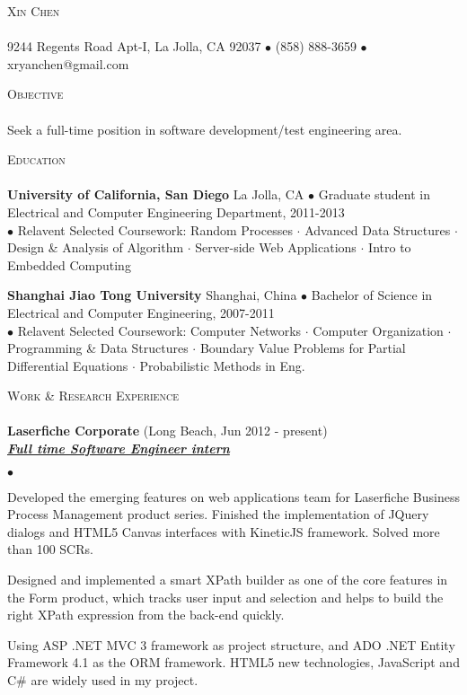 \documentclass{article}
\newcommand{\lineunder}{\vspace*{-8pt} \\ \hspace*{-18pt} \hrulefill \\}
\newcommand{\header}[1]{{\hspace*{-15pt}\vspace*{6pt} \textsc{#1}} \vspace*{-6pt} \lineunder}
\newcommand{\employer}[3]{{ \textbf{#1} (#2)\\ \underline{\textbf{\emph{#3}}}\\  }}
\newcommand{\contact}[2]{
\vspace*{-8pt}
\begin{center}
{\LARGE \scshape {#1}}
\lineunder 
#2
\end{center}
\vspace*{-8pt}
}
\newenvironment{achievements}{\begin{list}{$\bullet$}{\topsep 0pt \itemsep -2pt}}{\vspace*{4pt}\end{list}}
\newcommand{\schoolwithcourses}[4]{
 \textbf{#1} #2 $\bullet$ #3\\ 
#4\\
\vspace*{5pt}
}
\begin{document}
\small
\smallskip
\vspace*{-95pt}

\contact{Xin Chen}
{9244 Regents Road Apt-I, La Jolla, CA 92037 $\bullet$ (858) 888-3659 $\bullet$ xryanchen@gmail.com}

\header{Objective}
Seek a full-time position in software development/test engineering area.

\header{Education}

\schoolwithcourses{University of California, San Diego}{La Jolla, CA}{Graduate student in Electrical and Computer Engineering Department, 2011-2013}
{$\bullet$ Relavent Selected Coursework: Random Processes $\cdot$ Advanced Data Structures $\cdot$ Design \& Analysis of Algorithm $\cdot$ Server-side Web Applications $\cdot$ Intro to Embedded Computing}

\schoolwithcourses{Shanghai Jiao Tong University}{Shanghai, China}{Bachelor of Science in Electrical and Computer Engineering, 2007-2011}
{$\bullet$ Relavent Selected Coursework: Computer Networks $\cdot$ Computer Organization $\cdot$ 
	      Programming \& Data Structures $\cdot$ Boundary Value Problems for Partial Differential Equations $\cdot$ Probabilistic Methods in Eng.}

\header{Work \& Research Experience}
\employer{Laserfiche Corporate}{Long Beach, Jun 2012 - present}{Full time Software Engineer intern}
	\begin{achievements}
	\item Developed the emerging features on web applications team for Laserfiche Business Process Management product series. Finished the implementation of JQuery dialogs and HTML5 Canvas interfaces with KineticJS framework. Solved more than 100 SCRs.
	\item Designed and implemented a smart XPath builder as one of the core features in the Form product, which tracks user input and selection and helps to build the right XPath expression from the back-end quickly.
	\item Using ASP .NET MVC 3 framework as project structure, and ADO .NET Entity Framework 4.1 as the ORM framework. HTML5 new technologies, JavaScript and C\# are widely used in my project.
	\end{achievements}
\end{document}
